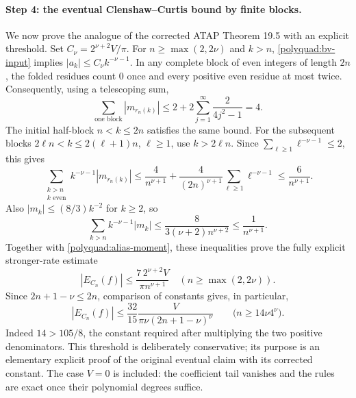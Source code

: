 \documentclass[11pt]{article}
\theoremstyle{remark}
\numberwithin{equation}{section}
\begin{document}
\paragraph{Step 4: the eventual Clenshaw--Curtis bound by finite blocks.}
We now prove the analogue of the corrected ATAP Theorem 19.5 with an
explicit threshold. Set $C_\nu=2^{\nu+2}V/\pi$. For
$n\ge\max(2,2\nu)$ and $k>n$, \eqref{polyquad:bv-input} implies
$|a_k|\le C_\nu k^{-\nu-1}$.
In any complete block of even integers of length $2n$, the folded
residues count $0$ once and every positive even residue at most twice.
Consequently, using a telescoping sum,
\begin{equation}
 \sum_{\text{one block}}|m_{r_n(k)}|
 \le2+2\sum_{j=1}^{\infty}\frac2{4j^2-1}=4.
 \label{polyquad:block-four}
\end{equation}
The initial half-block $n<k\le2n$ satisfies the same bound. For the
subsequent blocks $2\ell n<k\le2(\ell+1)n$, $\ell\ge1$, use
$k>2\ell n$. Since $\sum_{\ell\ge1}\ell^{-\nu-1}\le2$, this gives
\[
 \sum_{\substack{k>n\\k\text{ even}}}
       k^{-\nu-1}|m_{r_n(k)}|
 \le\frac4{n^{\nu+1}}+
       \frac4{(2n)^{\nu+1}}\sum_{\ell\ge1}\ell^{-\nu-1}
 \le\frac6{n^{\nu+1}}.
\]
Also $|m_k|\le(8/3)k^{-2}$ for $k\ge2$, so
\[
 \sum_{k>n}k^{-\nu-1}|m_k|
 \le\frac8{3(\nu+2)n^{\nu+2}}
 \le\frac1{n^{\nu+1}}.
\]
Together with \eqref{polyquad:alias-moment}, these inequalities prove
the fully explicit stronger-rate estimate
\begin{equation}
 |E_{C_n}(f)|\le\frac{7\,2^{\nu+2}V}{\pi n^{\nu+1}}
 \quad(n\ge\max(2,2\nu)).
 \label{polyquad:cc-extra-power}
\end{equation}
Since $2n+1-\nu\le2n$, comparison of constants gives, in particular,
\begin{equation}
 |E_{C_n}(f)|\le\frac{32}{15}
       \frac{V}{\pi\nu(2n+1-\nu)^\nu}
       \qquad\bigl(n\ge14\nu4^\nu\bigr).
 \label{polyquad:cc-eventual}
\end{equation}
Indeed $14>105/8$, the constant required after multiplying the two
positive denominators. This threshold is deliberately conservative;
its purpose is an elementary explicit proof of the original eventual
claim with its corrected constant. The case $V=0$ is included: the
coefficient tail vanishes and the rules are exact once their polynomial
degrees suffice.
\end{document}
